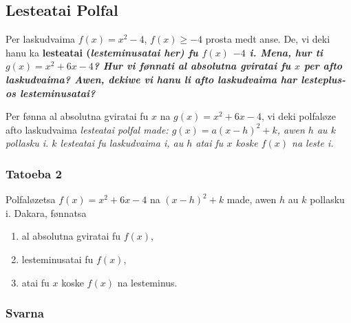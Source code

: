 \subsection{Lesteatai Polfal}
Per laskudvaima $f\left(x\right) = x^2-4$, $f\left(x\right)\geq-4$ prosta medt anse. De, vi deki hanu
ka \bf{lesteatai} (\it{lesteminusatai} her) fu $f\left(x\right)$ $-4$ i. Mena, hur ti
$g\left(x\right) = x^2+6x-4$? Hur vi fønnati al absolutna gviratai fu $x$ per afto laskudvaima?
Awen, dekiwe vi hanu li afto laskudvaima har lesteplus- os lesteminusatai?

Per fønna al absolutna gviratai fu $x$ na $g\left(x\right)=x^2+6x-4$, vi deki polfaløze afto
laskudvaima \it{lesteatai polfal} made: $g\left(x\right) = a{\left(x-h\right)}^2+k$, awen
$h$ au $k$ pollasku i. $k$ lesteatai fu laskudvaima i, au $h$ atai fu $x$ koske $f\left(x\right)$
na leste i.

\subsubsection{Tatoeba 2}
Polfaløzetsa $f\left(x\right)=x^2+6x-4$ na ${\left(x-h\right)}^2+k$ made,
awen $h$ au $k$ pollasku i. Dakara, fønnatsa
\begin{enumerate}
  \item al absolutna gviratai fu $f\left(x\right)$,
  \item lesteminusatai fu $f\left(x\right)$,
  \item atai fu $x$ koske $f\left(x\right)$ na lesteminus.
\end{enumerate}

\subsubsection{Svarna}


